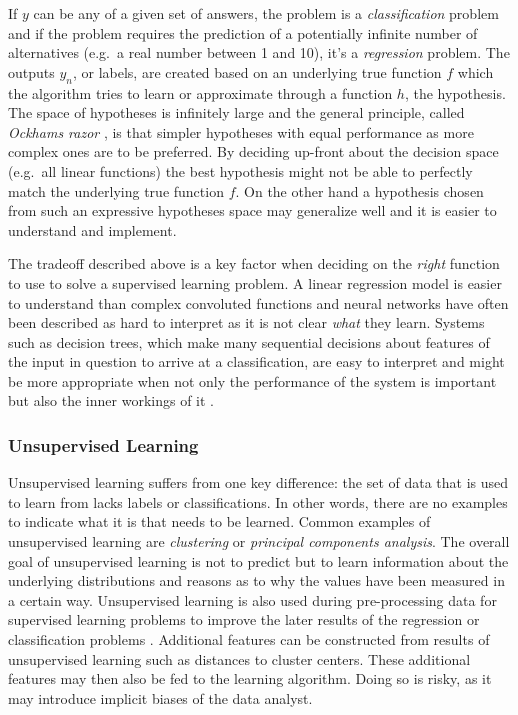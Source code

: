 If $y$ can be any of a given set of answers, the problem is a \emph{classification} problem and if the problem requires the
prediction of a potentially infinite number of alternatives (e.g.\ a real number between 1 and 10), it's a
\emph{regression} problem. The outputs $y_n$, or labels, are created based on an underlying true function $f$ which the
algorithm tries to learn or approximate through a function $h$, the hypothesis. The space of hypotheses is infinitely
large and the general principle, called \emph{Ockhams razor} , is that simpler hypotheses with equal performance as more complex
ones are to be preferred. By deciding up-front about the decision space (e.g.\ all linear functions) the best hypothesis
might not be able to perfectly match the underlying true function $f$. On the other hand a hypothesis chosen from such
an expressive hypotheses space may generalize well and it is easier to understand and implement.

The tradeoff described above is a key factor when deciding on the \emph{right} function to use to solve a supervised
learning problem. A linear regression model is easier to understand than complex convoluted functions and neural
networks have
often been described as hard to interpret as it is not clear \emph{what} they learn. Systems such as decision trees,
which make many sequential decisions about features of the input in question to arrive at a classification, are easy to
interpret and might be more appropriate when not only the performance of the system is important but also the
inner workings of it \citep[p.696ff.]{russell2016artificial}.


\subsubsection{Unsupervised Learning}
Unsupervised learning suffers from one key difference: the set of data that is used to learn from lacks labels or
classifications. In other words, there are no examples to indicate what it is that needs to be
learned. Common examples of unsupervised learning are \emph{clustering} or \emph{principal components analysis}. The
overall goal of unsupervised learning is not to predict but to learn information about the underlying distributions and
reasons as to why the values have been measured in a certain way. Unsupervised learning is also used during pre-processing
data for supervised learning problems to improve the later results of the regression or classification problems
\cite[p.373f.]{james2013introduction}.
Additional features can be constructed from results of unsupervised learning such as distances to cluster centers. These
additional features may then also be fed to the learning algorithm. Doing so is risky, as it may introduce
implicit biases of the data analyst.

